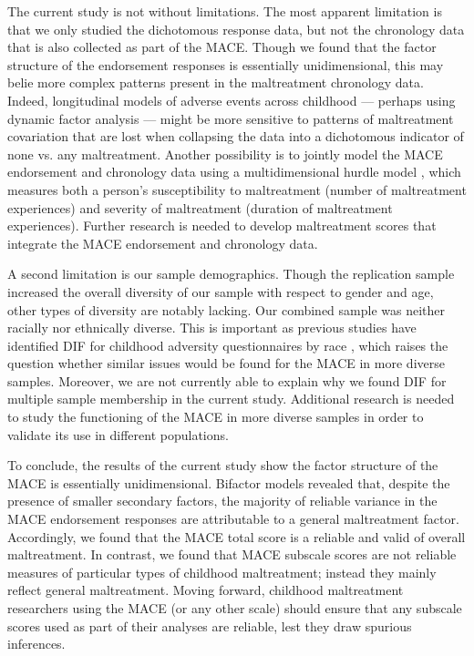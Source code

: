 \documentclass[letterpaper,man,natbib,floatsintext,longtable]{apa6}
\begin{document}
The current study is not without limitations. The most apparent limitation is that we only studied the dichotomous response data, but not the chronology data that is also collected as part of the MACE. Though we found that the factor structure of the endorsement responses is essentially unidimensional, this may belie more complex patterns present in the maltreatment chronology data. Indeed, longitudinal models of adverse events across childhood --- perhaps using dynamic factor analysis \citep{zhang2007bayesian} --- might be more sensitive to patterns of maltreatment covariation that are lost when collapsing the data into a dichotomous indicator of none vs. any maltreatment. Another possibility is to jointly model the MACE endorsement and chronology data using a multidimensional hurdle model \citep{magnus2021symptom}, which measures both a person's susceptibility to maltreatment (number of maltreatment experiences) and severity of maltreatment (duration of maltreatment experiences). Further research is needed to develop maltreatment scores that integrate the MACE endorsement and chronology data. 

A second limitation is our sample demographics. Though the replication sample increased the overall diversity of our sample with respect to gender and age, other types of diversity are notably lacking. Our combined sample was neither racially nor ethnically diverse. This is important as previous studies have identified DIF for childhood adversity questionnaires by race \citep{rodriguez2019identification}, which raises the question whether similar issues would be found for the MACE in more diverse samples. Moreover, we are not currently able to explain why we found DIF for multiple  sample membership in the current study. Additional research is needed to study the functioning of the MACE in more diverse samples in order to validate its use in different populations. 

To conclude, the results of the current study show the factor structure of the MACE is essentially unidimensional. Bifactor models revealed that, despite the presence of smaller secondary factors, the majority of reliable variance in the MACE endorsement responses are attributable to a general maltreatment factor. Accordingly, we found that the MACE total score is a reliable and valid of overall maltreatment. In contrast, we found that MACE subscale scores are not reliable measures of particular types of childhood maltreatment; instead they mainly reflect general maltreatment. Moving forward, childhood maltreatment researchers using the MACE (or any other scale) should ensure that any subscale scores used as part of their analyses are reliable, lest they draw spurious inferences. 
\end{document}

